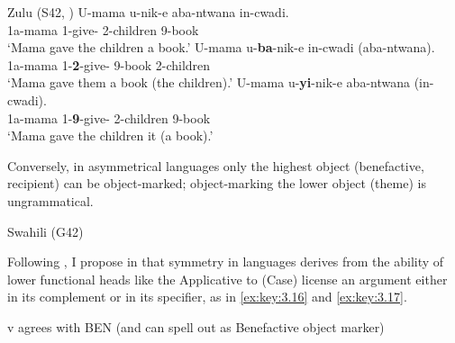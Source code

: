 \documentclass[output=paper]{langsci/langscibook}
\begin{document}
\ea\label{ex:key:3.14}Zulu (S42, \citealt[11]{Adams2010})
	\ea
	\gll	 U-mama  u-nik-e  aba-ntwana   in-cwadi.\\
	    1a-mama  1\Sm{}{}-give-\Pfv{}  2-children  9-book\\
	\glt    ‘Mama gave the children a book.’
	\ex
	\gll	 U-mama  u-\textbf{ba}{}-nik-e  in-cwadi  (aba-ntwana).\\
	    1a-mama  1\Sm{}{}-\textbf{2\Om{}}-give-\Pfv{}  9-book  2-children\\
	\glt    ‘Mama gave them a book (the children).’
	\ex
    \gll U-mama  u-\textbf{yi}{}-nik-e  aba-ntwana   (in-cwadi).\\
    1a-mama  1\Sm{}{}-\textbf{9\Om{}}-give-\Pfv{}  2-children  9-book\\
    \glt ‘Mama gave the children it (a book).’
    \z
\z

Conversely, in asymmetrical languages only the highest object (benefactive,
recipient) can be object-marked; object-marking the lower object (theme) is
ungrammatical.\largerpage[2]

\ea\label{ex:key:3.15} Swahili (G42)
    \z
\z

Following \textcite{HaddicanHolmberg2012,HaddicanHolmberg2015}, I propose in
\Textcite{vanderWal2017} that symmetry in  languages derives from the
ability of lower functional heads like the Applicative to (Case) license an
argument either in its complement or in its specifier, as in \eqref{ex:key:3.16}
and \eqref{ex:key:3.17}.

\ea\label{ex:key:3.16}v agrees with \gls{BEN} (and can spell out as Benefactive object marker)
\z
\end{document}
